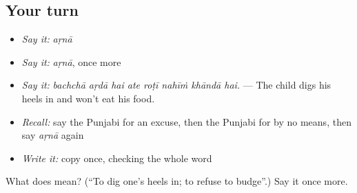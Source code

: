 \subsection*{Your turn}
\begin{itemize}
\raggedright
  \item \emph{Say it:} \emph{aṛnā}
  \item \emph{Say it:} \emph{aṛnā}, once more
  \item \emph{Say it:} \emph{bachchā aṛdā hai ate roṭī nahīṁ khāndā hai.} — The child digs his heels in and won't eat his food.
  \item \emph{Recall:} say the Punjabi for an excuse, then the Punjabi for by no means, then say \emph{aṛnā} again
  \item \emph{Write it:} copy \textbf{} once, checking the whole word
\end{itemize}

\begin{tcolorbox}[breakable,colback=teal!4,colframe=teal!35!black,title={Before you move on}]
What does  mean? (\textquotedblleft{}To dig one's heels in; to refuse to budge\textquotedblright{}.) Say it once more.
\end{tcolorbox}
